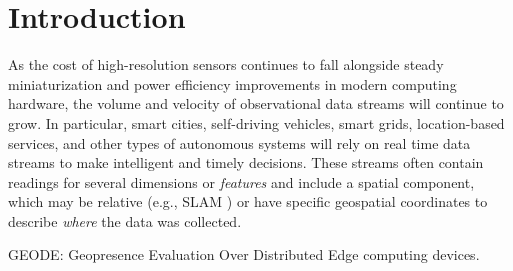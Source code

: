 \section{Introduction}

As the cost of high-resolution sensors continues to fall alongside steady miniaturization and power efficiency improvements in modern computing hardware, the volume and velocity of observational data streams will continue to grow. In particular, smart cities, self-driving vehicles, smart grids, location-based services, and other types of autonomous systems will rely on real time data streams to make intelligent and timely decisions. These streams often contain readings for several dimensions or \emph{features} and include a spatial component, which may be relative (e.g., SLAM \cite{}) or have specific geospatial coordinates to describe \emph{where} the data was collected.

\textsc{GEODE}: Geopresence Evaluation Over Distributed Edge computing devices.


